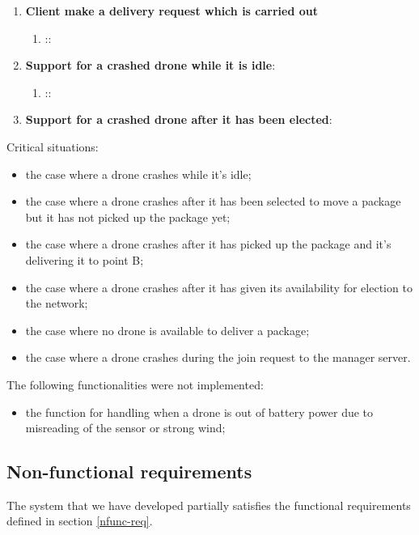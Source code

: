 \documentclass[a4paper, oneside]{memoir}
\begin{document}
\begin{enumerate}
\item \textbf{Client make a delivery request which is carried out}
	\begin{enumerate}
	\item \textsf{} ::
	\end{enumerate}

\item \textbf{Support for a crashed drone while it is idle}:
	\begin{enumerate}
	\item \textsf{} ::
	\end{enumerate}
\item \textbf{Support for a crashed drone after it has been elected}:

\end{enumerate}

Critical situations:
\begin{itemize}
	\item the case where a drone crashes while it's idle;
	\item the case where a drone crashes after it has been selected to move a package but it has not picked up the package yet;
	\item the case where a drone crashes after it has picked up the package and it's delivering it to point B;
	\item the case where a drone crashes after it has given its availability for election to the network;
	\item the case where no drone is available to deliver a package;
	\item the case where a drone crashes during the join request to the manager server.
\end{itemize}

The following functionalities were not implemented:
\begin{itemize}
	\item the function for handling when a drone is out of battery power due to misreading of the sensor or strong wind;
\end{itemize}





\subsection{Non-functional requirements}
The system that we have developed partially satisfies the functional requirements defined in section \ref{nfunc-req}.
\end{document}
